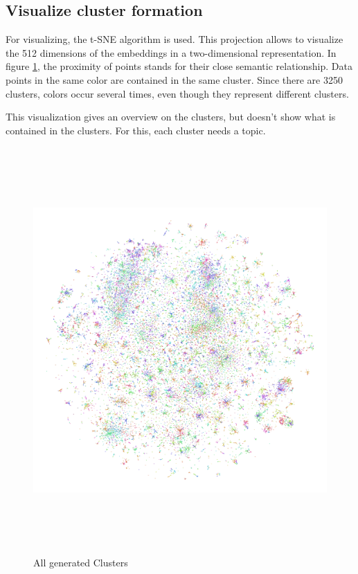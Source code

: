 \subsection{Visualize cluster formation}
For visualizing, the \ac{t-SNE} algorithm is used. This projection allows to visualize the 512 dimensions of the embeddings in a two-dimensional representation. In figure \ref{fig:kmeans}, the proximity of points stands for their close semantic relationship. Data points in the same color are contained in the same cluster. Since there are 3250 clusters, colors occur several times, even though they represent different clusters.

This visualization gives an overview on the clusters, but doesn't show what is contained in the clusters. For this, each cluster needs a topic.

\begin{figure}[!h]
	\centering
	\includegraphics[height=15.5cm]{Bilder/models/minibatchkmeans.pdf}
	\caption{All generated Clusters}
	\label{fig:kmeans}
\end{figure}


\newpage
